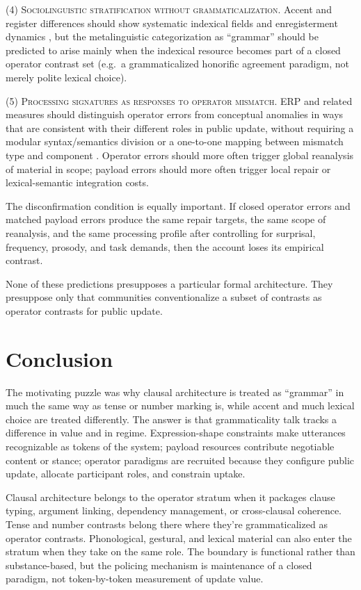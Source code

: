 \documentclass[12pt,letterpaper]{article}
\begin{document}
\textsc{(4) Sociolinguistic stratification without grammaticalization.} Accent and register differences should show systematic indexical fields and enregisterment dynamics \citep{eckert2008,agha2007}, but the metalinguistic categorization as \enquote{grammar} should be predicted to arise mainly when the indexical resource becomes part of a closed operator contrast set (e.g.\ a grammaticalized honorific agreement paradigm, not merely polite lexical choice).

\textsc{(5) Processing signatures as responses to operator mismatch.} ERP and related measures should distinguish operator errors from conceptual anomalies in ways that are consistent with their different roles in public update, without requiring a modular syntax/semantics division or a one-to-one mapping between mismatch type and component \citep{kutashillyard1980,osterhoutholcomb1992,friederici2011}. Operator errors should more often trigger global reanalysis of material in scope; payload errors should more often trigger local repair or lexical-semantic integration costs.

The disconfirmation condition is equally important. If closed operator errors and matched payload errors produce the same repair targets, the same scope of reanalysis, and the same processing profile after controlling for surprisal, frequency, prosody, and task demands, then the account loses its empirical contrast.

None of these predictions presupposes a particular formal architecture. They presuppose only that communities conventionalize a subset of contrasts as operator contrasts for public update.

\section{Conclusion}

The motivating puzzle was why clausal architecture is treated as \enquote{grammar} in much the same way as tense or number marking is, while accent and much lexical choice are treated differently. The answer is that grammaticality talk tracks a difference in value and in regime. Expression-shape constraints make utterances recognizable as tokens of the system; payload resources contribute negotiable content or stance; operator paradigms are recruited because they configure public update, allocate participant roles, and constrain uptake.

Clausal architecture belongs to the operator stratum when it packages clause typing, argument linking, dependency management, or cross-clausal coherence. Tense and number contrasts belong there where they're grammaticalized as operator contrasts. Phonological, gestural, and lexical material can also enter the stratum when they take on the same role. The boundary is functional rather than substance-based, but the policing mechanism is maintenance of a closed paradigm, not token-by-token measurement of update value.
\end{document}
